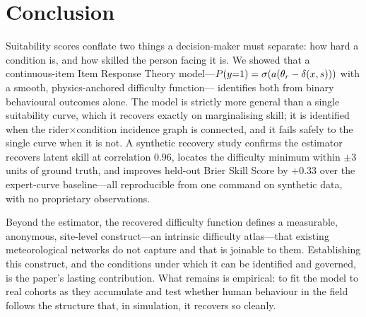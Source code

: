 \section{Conclusion}
\label{sec:conclusion}

Suitability scores conflate two things a decision-maker must separate: how hard a
condition is, and how skilled the person facing it is. We showed that a
continuous-item Item Response Theory model---$P(y{=}1) = \sigma(a(\theta_r -
\delta(x,s)))$ with a smooth, physics-anchored difficulty function---
identifies both from binary behavioural outcomes alone. The model is strictly more
general than a single suitability curve, which it recovers exactly on marginalising
skill; it is identified when the rider${\times}$condition incidence graph is
connected, and it fails safely to the single curve when it is not. A synthetic
recovery study confirms the estimator recovers latent skill at correlation $0.96$,
locates the difficulty minimum within $\pm 3$ units of ground truth, and improves
held-out Brier Skill Score by $+0.33$ over the expert-curve baseline---all
reproducible from one command on synthetic data, with no proprietary observations.

Beyond the estimator, the recovered difficulty function defines a measurable,
anonymous, site-level construct---an intrinsic difficulty atlas---that existing
meteorological networks do not capture and that is joinable to them. Establishing
this construct, and the conditions under which it can be identified and governed,
is the paper's lasting contribution. What remains is empirical: to fit the model
to real cohorts as they accumulate and test whether human behaviour in the field
follows the structure that, in simulation, it recovers so cleanly.

